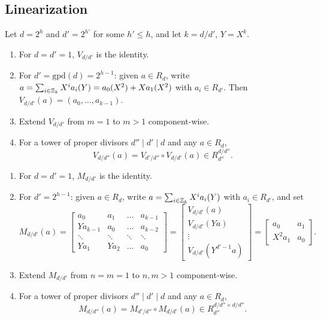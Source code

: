\subsection{Linearization}

Let $d = 2^h$ and $d' = 2^{h'}$ for some $h' \leq h$, and let $k = d/d'$, $Y = X^k$.

\begin{definition}[$V_{d/d'} : R_d^m \to R_{d'}^{km}$]
	\leavevmode\par
	\begin{enumerate}
		\item For $d = d' = 1$, $V_{d/d'}$ is the identity.
		\item For $d' = \mathrm{gpd}(d) = 2^{h-1}$: given $a \in R_d$, write $a = \sum_{i \in \mathbb{Z}_k} X^i a_i(Y) = a_0(X^2) + X a_1(X^2)$ with $a_i \in R_{d'}$. Then $V_{d/d'}(a) = (a_0, \dots, a_{k-1})$.
		\item Extend $V_{d/d'}$ from $m=1$ to $m>1$ component-wise.
		\item For a tower of proper divisors $d'' \mid d' \mid d$ and any $a \in R_d$,
		\[
			V_{d/d''}(a) = V_{d'/d''} \circ V_{d/d'}(a) \in R_{d''}^{d/d''}.
		\]
	\end{enumerate}
\end{definition}

\begin{definition}
	\leavevmode\par
	\begin{enumerate}
		\item For $d = d' = 1$, $M_{d/d'}$ is the identity.
		\item For $d' = 2^{h-1}$: given $a \in R_d$, write $a = \sum_{i \in \mathbb{Z}_k} X^i a_i(Y)$ with $a_i \in R_{d'}$, and set
		\[
			M_{d/d'}(a) =
			\begin{bmatrix}
				a_0 & a_1 & \dots & a_{k-1} \\
				Ya_{k-1} & a_0 & \dots & a_{k-2} \\
				\ddots & \ddots & \ddots & \ddots \\
				Ya_1 & Ya_2 & \dots & a_0
			\end{bmatrix}
			=
			\begin{bmatrix}
				V_{d/d'}(a) \\ V_{d/d'}(Ya) \\ \vdots \\ V_{d/d'}(Y^{d'-1}a)
			\end{bmatrix}
			=
			\begin{bmatrix}
				a_0 & a_1 \\ X^2 a_1 & a_0
			\end{bmatrix}.
		\]
		\item Extend $M_{d/d'}$ from $n=m=1$ to $n,m>1$ component-wise.
		\item For a tower of proper divisors $d'' \mid d' \mid d$ and any $a \in R_d$,
		\[
			M_{d/d''}(a) = M_{d'/d''} \circ M_{d/d'}(a) \in R_{d''}^{d/d'' \times d/d''}.
		\]
	\end{enumerate}
\end{definition}

